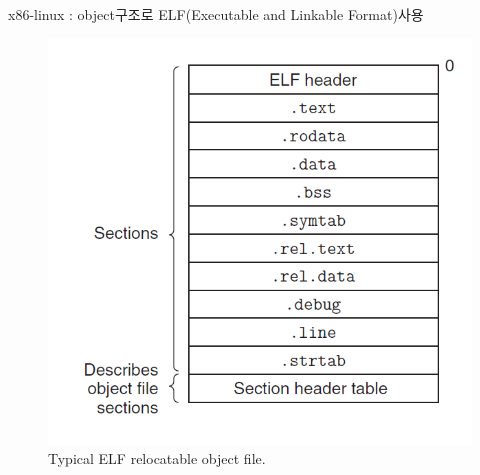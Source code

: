 \documentclass[10pt]{beamer}
\begin{document}
\begin{frame}{}
    x86-linux : object구조로 ELF(Executable and Linkable Format)사용
    \begin{figure}[h!]
        \centering
        \includegraphics[scale=0.5]{pic2}
        \caption{Typical ELF relocatable object file.}
    \end{figure}
\end{frame}    
\end{document}
